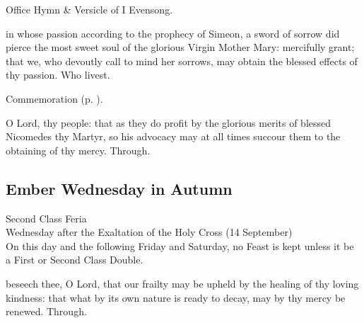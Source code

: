 \secondEvensong
{}

\begin{rubric}
	Office Hymn \& Versicle of I Evensong.
\end{rubric}


\collect
{} in whose passion according to the prophecy of Simeon, a sword of sorrow did pierce the most sweet soul of the glorious Virgin Mother Mary: mercifully grant; that we, who devoutly call to mind her sorrows, may obtain the blessed effects of thy passion. Who livest.
\begin{rubric}
	 Commemoration  (p. \pageref{NicomedesCollect}).
\end{rubric}


\clearpage
{}

\memorialCollect\label{NicomedesCollect}
 O Lord, thy people: that as they do profit by the glorious merits of blessed Nicomedes thy Martyr, so his advocacy may at all times succour them to the obtaining of thy mercy. Through.


\subsection{Ember Wednesday in Autumn}
\begin{inhead}
    {Second Class Feria\\
Wednesday after the Exaltation of the Holy Cross (14 September)\\
On this day and the following Friday and Saturday, no Feast is kept unless it be a First or Second Class Double.}
\end{inhead}


{} beseech thee, O Lord, that our frailty may be upheld by the healing of thy loving kindness: that what by its own nature is ready to decay, may by thy mercy be renewed. Through.


